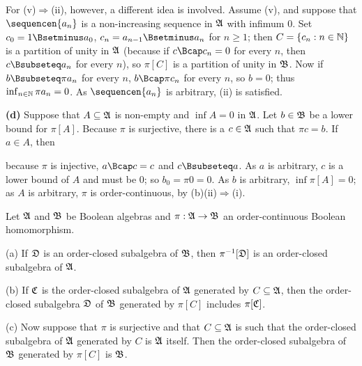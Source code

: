 {For (v)$\Rightarrow$(ii), however, a different idea is involved.
Assume (v), and suppose that $\sequencen{a_n}$ is a non-increasing
sequence in $\frak A$ with infimum $0$.   Set $c_0=1\Bsetminus a_0$,
$c_n=a_{n-1}\Bsetminus a_{n}$ for $n\ge 1$;  then $C=\{c_n:n\in\Bbb N\}$
is a partition of unity in $\frak A$ (because if $c\Bcap c_n=0$ for
every $n$, then $c\Bsubseteq a_n$ for every $n$), so $\pi[C]$ is a
partition of unity in $\frak B$.
Now if $b\Bsubseteq\pi a_n$ for every $n$,
$b\Bcap\pi c_n$ for every $n$, so $b=0$;  thus $\inf_{n\in\Bbb
N}\pi a_n=0$.   As $\sequencen{a_n}$ is arbitrary, (ii) is satisfied.

\medskip

{\bf (d)} Suppose that $A\subseteq\frak A$ is non-empty and
$\inf A=0$ in $\frak A$.   Let $b\in\frak B$ be a
lower bound for $\pi[A]$.   Because $\pi$ is surjective,
there is a $c\in\frak A$ such that
$\pi c=b$.   If $a\in A$, then


\noindent because $\pi$ is injective, $a\Bcap c=c$ and
$c\Bsubseteq a$.   As $a$ is arbitrary, $c$ is a lower bound of $A$
and must be $0$;  so $b_0=\pi 0=0$.   As $b$ is arbitrary, $\inf\pi[A]=0$;
as $A$ is arbitrary, $\pi$ is order-continuous, by (b)(ii)$\Rightarrow$(i).
}%

 Let $\frak A$ and $\frak B$ be Boolean algebras
and $\pi:\frak A\to\frak B$ an order-continuous Boolean homomorphism.

(a) If $\frak D$ is an order-closed subalgebra of $\frak B$, then
$\pi^{-1}[\frak D]$ is an order-closed subalgebra of $\frak A$.

(b) If $\frak C$ is the order-closed subalgebra of $\frak A$ generated
by $C\subseteq\frak A$, then the order-closed subalgebra $\frak D$ of
$\frak B$ generated by $\pi[C]$ includes $\pi[\frak C]$.

(c) Now suppose that $\pi$ is surjective and that $C\subseteq\frak A$ is
such that the order-closed subalgebra of $\frak A$ generated by $C$ is
$\frak A$ itself.   Then the order-closed subalgebra of $\frak B$
generated by $\pi[C]$ is $\frak B$.



